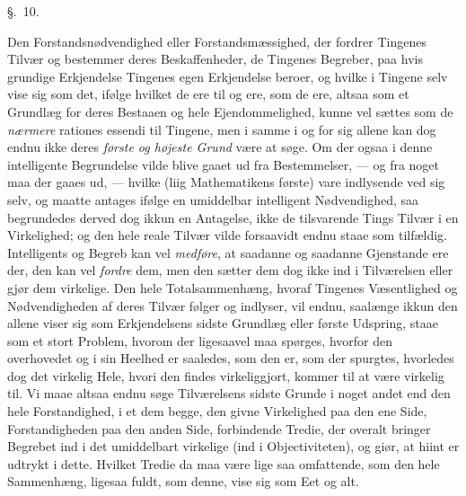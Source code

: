 \documentclass[12pt,a4paper]{book}
\newcommand{\apage}[1]{\marginnote{\footnotesize\textit{[#1]}}}
\begin{document}
\begin{center}\large\S.~10.\end{center}

\apage{104} Den Forstandsnødvendighed eller Forstandsmæssighed, der fordrer Tingenes Tilvær
og bestemmer deres Beskaffenheder, de Tingenes Begreber, paa hvis grundige
Erkjendelse Tingenes egen Erkjendelse beroer, og hvilke i Tingene selv vise sig
som det, ifølge hvilket de ere til og ere, som de ere, altsaa som et Grundlæg for
deres Bestaaen og hele Ejendommelighed, kunne vel sættes som de \emph{nærmere}
rationes essendi til Tingene, men i samme i og for sig allene kan dog endnu ikke
deres \emph{første og højeste Grund} være at søge. Om der ogsaa i denne
intelligente Begrundelse vilde blive gaaet ud fra Bestemmelser, --- og fra noget
maa der gaaes ud, --- hvilke (liig Mathematikens første) vare indlysende ved sig
selv, og maatte antages ifølge en umiddelbar intelligent Nødvendighed, saa
begrundedes derved dog ikkun en Antagelse, ikke de tilsvarende Tings Tilvær i en
Virkelighed; og den hele reale Tilvær vilde forsaavidt endnu staae som tilfældig.
Intelligents og Begreb kan vel \emph{medføre}, at saadanne og saadanne Gjenstande
ere der, den kan vel \emph{fordre} dem, men den sætter dem dog ikke ind i
Tilværelsen eller gjør dem virkelige. Den hele Totalsammenhæng, hvoraf Tingenes
Væsentlighed og Nødvendigheden af deres Tilvær følger og indlyser, vil endnu,
saalænge ikkun den allene viser sig som \apage{105} Erkjendelsens sidste Grundlæg eller første
Udspring, staae som et stort Problem, hvorom der ligesaavel maa spørges, hvorfor
den overhovedet og i sin Heelhed er saaledes, som den er, som der spurgtes,
hvorledes dog det virkelig Hele, hvori den findes virkeliggjort, kommer til at
være virkelig til. Vi maae altsaa endnu søge Tilværelsens sidste Grunde i noget
andet end den hele Forstandighed, i et dem begge, den givne Virkelighed paa den
ene Side, Forstandigheden paa den anden Side, forbindende Tredie, der overalt
bringer Begrebet ind i det umiddelbart virkelige (ind i Objectiviteten), og giør,
at hiint er udtrykt i dette. Hvilket Tredie da maa være lige saa omfattende, som
den hele Sammenhæng, ligesaa fuldt, som denne, vise sig som Eet og alt.
\end{document}
